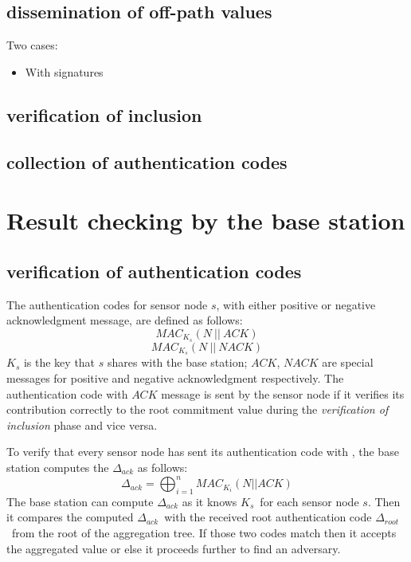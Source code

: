 	\subsection{dissemination of off-path values}
		Two cases:
		\begin{itemize}
			\item {With signatures}
		\end{itemize}
	\subsection{verification of inclusion}
	\subsection{collection of authentication codes}

\section{Result checking by the base station}
	\subsection{verification of authentication codes}
		\label{sec:verficiation-of-authentication-codes}
		The authentication codes for sensor node $s$, with either positive or negative acknowledgment message, are defined as follows:
		\begin{equation}
			MAC_{K_{s}}(N\ ||\ \textit{ACK})
		\end{equation}
		\begin{equation}
			MAC_{K_{s}}(N\ ||\ \textit{NACK})
		\end{equation}
		$K_{s}$ is the key that $s$ shares with the base station;
		$\textit{ACK}$, $\textit{NACK}$ are special messages for positive and negative acknowledgment respectively.
		The authentication code with $\textit{ACK}$ message is sent by the sensor node if it verifies its contribution correctly to the root commitment value during the 
		\textit{verification of inclusion} phase and vice versa.
		
		To verify that every sensor node has sent its authentication code with \ack, the base station computes the $\Delta_{ack}$ as follows:
		\begin{equation}
			\displaystyle{\Delta_{ack} = \bigoplus_{i = 1}^n MAC_{K_{i}}(N || ACK) }
		\end{equation}
		The base station can compute $\Delta_{ack}$ as it knows $K_{s}$\ for each sensor node $s$.
		Then it compares the computed $\Delta_{ack}$\ with the received root authentication code $\Delta_{root}$\ from the root of the aggregation tree. 
		If those two codes match then it accepts the aggregated value or else it proceeds further to find an adversary. 

